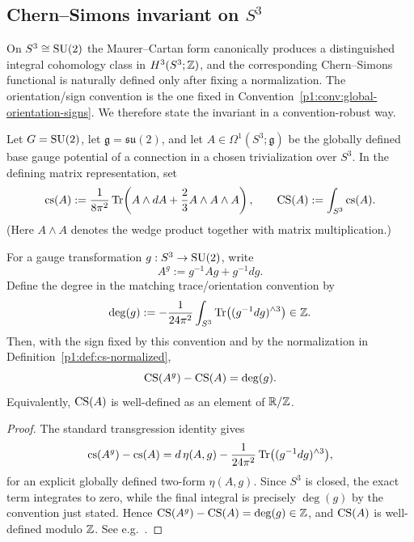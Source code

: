 \documentclass[11pt]{article}
\begin{document}
\subsection{\texorpdfstring{Chern--Simons invariant on $S^3$}{Chern--Simons invariant on S3}}
\label{p1:sec:cs-invariant}

On $S^3 \cong \mathrm{SU}(2)$ the Maurer--Cartan form canonically produces a distinguished
integral cohomology class in $H^3(S^3;\mathbb{Z})$, and the corresponding
Chern--Simons functional is naturally defined only after fixing a normalization.
The orientation/sign convention is the one fixed in Convention~\ref{p1:conv:global-orientation-signs}.
We therefore state the invariant in a convention-robust way.

\begin{definition}\label{p1:def:cs-normalized}
Let \(G=\mathrm{SU}(2)\), let \(\mathfrak g=\mathfrak{su}(2)\), and let
\(A\in\Omega^1(S^3;\mathfrak g)\) be the globally defined base gauge potential
of a connection in a chosen trivialization over \(S^3\).
In the defining matrix representation, set
\[
\mathrm{cs}(A)
:=\frac{1}{8\pi^2}\operatorname{Tr}\!\left(A\wedge dA+\frac{2}{3}A\wedge A\wedge A\right),
\qquad
\mathrm{CS}(A):=\int_{S^3}\mathrm{cs}(A).
\]
(Here $A\wedge A$ denotes the wedge product together with matrix multiplication.)
\end{definition}

\begin{proposition}\label{p1:prop:cs-gauge-ambiguity}
For a gauge transformation $g:S^3\to \mathrm{SU}(2)$, write
\[
A^g:=g^{-1}Ag+g^{-1}dg.
\]
Define the degree in the matching trace/orientation convention by
\[
\deg(g):=-\frac{1}{24\pi^2}\int_{S^3}\operatorname{Tr}\bigl((g^{-1}dg)^{\wedge 3}\bigr)\in\mathbb{Z}.
\]
Then, with the sign fixed by this convention and by the normalization in
Definition~\ref{p1:def:cs-normalized},
\[
\mathrm{CS}(A^g)-\mathrm{CS}(A)=\deg(g).
\]
Equivalently, $\mathrm{CS}(A)$ is well-defined as an element of $\mathbb{R}/\mathbb{Z}$.
\end{proposition}

\begin{proof}
The standard transgression identity gives
\[
\mathrm{cs}(A^g)-\mathrm{cs}(A)
=d\,\eta(A,g)-\frac{1}{24\pi^2}\operatorname{Tr}\bigl((g^{-1}dg)^{\wedge 3}\bigr),
\]
for an explicit globally defined two-form \(\eta(A,g)\).  Since \(S^3\) is closed,
the exact term integrates to zero, while the final integral is precisely
\(\deg(g)\) by the convention just stated. Hence \(\mathrm{CS}(A^g)-\mathrm{CS}(A)=\deg(g)\in\mathbb{Z}\),
and \(\mathrm{CS}(A)\) is well-defined modulo \(\mathbb{Z}\).  See e.g.\ \cite{ChernSimons1974,bott1982differential}.
\end{proof}
\end{document}
